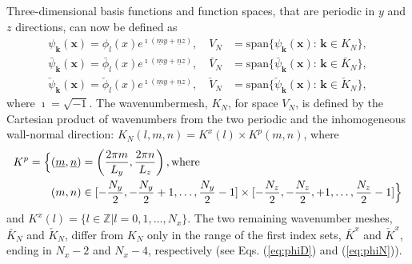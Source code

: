 \documentclass[preprint]{elsarticle}
\newcommand{\N}[1]{\check{#1}}
\newcommand{\D}[1]{\bar{#1}}
\begin{document}
Three-dimensional basis functions and function spaces, that are periodic in $y$ 
and $z$ directions, can now be defined as
\begin{align}
  \psi_{\bm{k}}(\bm{x}) = \phi_{l}(x)e^{ \imath(\underline{m} y + \underline{n} z)}, \quad V_N &= \text{span} \{ \psi_{\bm{k}}(\bm{x}):\, \bm{k} \in K_N  \}, \\
  \D{\psi}_{\bm{k}}(\bm{x}) = \D{\phi}_{l}(x)e^{ \imath(\underline{m} y + \underline{n} z)}, \quad \D{V}_N &= \text{span} \{ \D{\psi}_{\bm{k}}(\bm{x}):\, \bm{k} \in \D{K}_N  \}, \\
  \N{\psi}_{\bm{k}}(\bm{x}) = \N{\phi}_{l}(x)e^{ \imath(\underline{m} y + \underline{n} z)}, \quad \N{V}_N &= \text{span} \{ \N{\psi}_{\bm{k}}(\bm{x}):\, \bm{k} \in \N{K}_N  \},
\end{align}
where $\imath=\sqrt{-1}$. 
The wavenumbermesh, $K_N$, for space $V_{N}$, is defined by the Cartesian product of wavenumbers from the two periodic and the inhomogeneous wall-normal direction: $K_N(l,m,n)= K^x(l) \times K^p(m,n)$, where
\begin{align}
K^p = \Big\{&(\underline{m}, \underline{n}) = \left(\frac{2 \pi m}{L_y}, \frac{2 \pi n}{L_z} \right), \text{where} \notag \\
&(m, n) \in  [-\frac{N_y}{2},-\frac{N_y}{2}+1,\ldots, 
\frac{N_y}{2}-1] \times [-\frac{N_z}{2},-\frac{N_z}{2},+1,\ldots, \frac{N_z}{2}-1] \Big\} 
\label{eq:wavenumbermeshp}
\end{align}
and $K^x(l) = \{l \in \mathbb{Z} | l=0,1, \ldots, N_x\}$. The two remaining wavenumber meshes, $\D{K}_{N}$ and $\N{K}_{N}$, differ from $K_N$ only in the range of the first index sets, $\D{K}^x$ and $\N{K}^x$, ending in $N_x-2$ and $N_x-4$, respectively (see Eqs. (\ref{eq:phiD}) and (\ref{eq:phiN})). 
\end{document}
